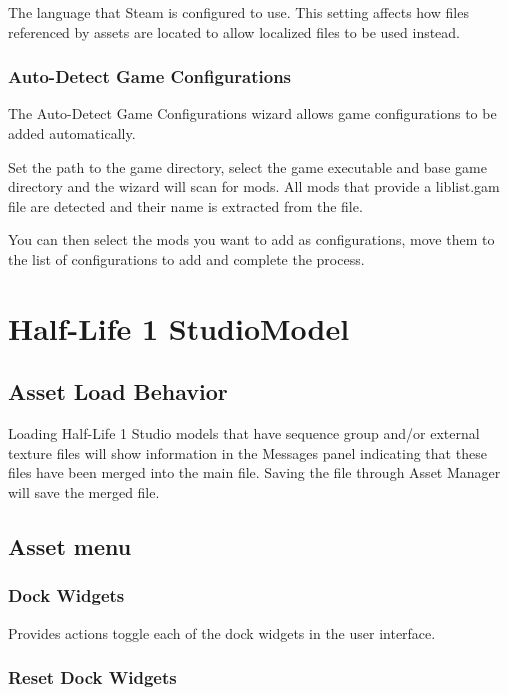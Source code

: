 \documentclass[10pt, a4paper, titlepage, oneside]{article}
\begin{document}
The language that Steam is configured to use. This setting affects how files referenced by assets are located to allow localized files to be used instead.

\subsubsection{Auto-Detect Game Configurations}

The Auto-Detect Game Configurations wizard allows game configurations to be added automatically.

\vspace{\baselineskip}
Set the path to the game directory, select the game executable and base game directory and the wizard will scan for mods. All mods that provide a liblist.gam file are detected and their name is extracted from the file.

\vspace{\baselineskip}
You can then select the mods you want to add as configurations, move them to the list of configurations to add and complete the process.

\newpage

\section{Half-Life 1 StudioModel}
\label{sec:hl1studiomodel}

\subsection{Asset Load Behavior}

Loading Half-Life 1 Studio models that have sequence group and/or external texture files will show information in the Messages panel indicating that these files have been merged into the main file. Saving the file through Asset Manager will save the merged file.

\subsection{Asset menu}

\subsubsection{Dock Widgets}

Provides actions toggle each of the dock widgets in the user interface.

\subsubsection{Reset Dock Widgets}
\end{document}
